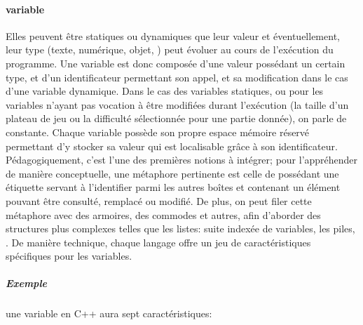         \paragraph{variable}
            Elles peuvent être statiques ou dynamiques \cad que leur valeur et éventuellement, leur type (\eg texte, numérique, objet, \etc) peut  évoluer au cours de l'exécution du programme. Une variable est donc composée d'une valeur possédant un certain type, et d'un identificateur permettant son appel, et sa modification dans le cas d'une variable dynamique.
            Dans le cas des variables statiques, ou pour les variables n'ayant pas vocation à être modifiées durant l'exécution (\eg la taille d'un plateau de jeu ou la difficulté sélectionnée pour une partie donnée), on parle de constante. 
            Chaque variable possède son propre espace mémoire réservé permettant d'y stocker sa valeur qui est localisable grâce à son identificateur. 
            Pédagogiquement, c'est l'une des premières notions à intégrer; pour  l'appréhender de manière conceptuelle, une métaphore pertinente est celle de  possédant une étiquette servant à l'identifier parmi les autres boîtes et contenant un élément pouvant être consulté, remplacé ou modifié. De plus, on peut filer cette métaphore avec des armoires, des commodes et autres, afin d'aborder des structures plus complexes telles que les listes: suite indexée de variables, les piles, \etc.
            De manière technique, chaque langage offre un jeu de caractéristiques spécifiques pour les variables.
            \subparagraph{Exemple}
                une variable en C++ aura sept caractéristiques:
